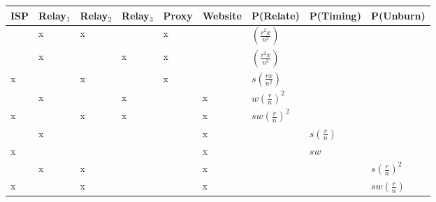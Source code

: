 \begin{center}
\begin{tabular}{l | l | l | l | l | l | l | l | l}
  ISP & Relay$_1$ & Relay$_2$ & Relay$_3$ & Proxy & Website & P(Relate)             & P(Timing) & P(Unburn) \\
  \hline
      & x         & x         &           & x     &         & $(\frac{r^2x}{n^3})$  & & \\
  \hline
      & x         &           & x         & x     &         & $(\frac{r^2x}{n^3})$  & & \\
  \hline
  x   &           & x         &           & x     &         & $s(\frac{rx}{n^2})$ & & \\
  \hline
      & x         &           & x         &       & x       & $w(\frac{r}{n})^2$ & & \\
  \hline
  x   &           & x         & x         &       & x       & $sw(\frac{r}{n})^2$ & & \\
  \hline
      & x         &           &           &       & x       &                    & $s(\frac{r}{n})$ & \\
  \hline
  x   &           &           &           &       & x       &                    & $sw$ & \\
  \hline
      & x         & x         &           &       & x       &                    &      & $s(\frac{r}{n})^2$ \\
  \hline
  x   &           & x         &           &       & x       &                    &      & $sw(\frac{r}{n})$ \\
\end{tabular}
\end{center}
